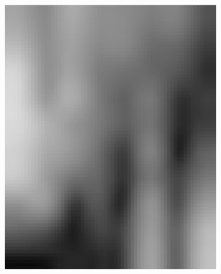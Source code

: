 \begin{figure}[h!]
\begin{subfigure}{0.22\textwidth}
		\includegraphics[width=\linewidth]{Images/KDDProcess/fourthFilter}
		\caption{}    %
		\label{subfig:fourthFilter}
	\end{subfigure}
	
	\medskip
	

\end{figure}
